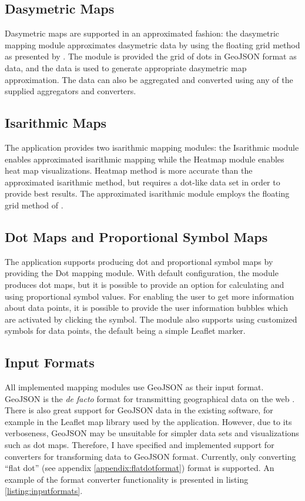 \subsection{Dasymetric Maps}

Dasymetric maps are supported in an approximated fashion: the dasymetric mapping module approximates dasymetric data by using the floating grid method as presented by \citet{langford_generating_1994}. The module is provided the grid of dots in GeoJSON format as data, and the data is used to generate appropriate dasymetric map approximation. The data can also be aggregated and converted using any of the supplied aggregators and converters.

\subsection{Isarithmic Maps}

The application provides two isarithmic mapping modules: the Isarithmic module enables approximated isarithmic mapping while the Heatmap module enables heat map visualizations. Heatmap method is more accurate than the approximated isarithmic method, but requires a dot-like data set in order to provide best results. The approximated isarithmic module employs the floating grid method of \citet{langford_generating_1994}.

\subsection{Dot Maps and Proportional Symbol Maps}

The application supports producing dot and proportional symbol maps by providing the Dot mapping module. With default configuration, the module produces dot maps, but it is possible to provide an option for calculating and using proportional symbol values. For enabling the user to get more information about data points, it is possible to provide the user information bubbles which are activated by clicking the symbol. The module also supports using customized symbols for data points, the default being a simple Leaflet marker.

\subsection{Input Formats}

All implemented mapping modules use GeoJSON as their input format. GeoJSON is the \emph{de facto} format for transmitting geographical data on the web \citep{bostock_code_2013}. There is also great support for GeoJSON data in the existing software, for example in the Leaflet map library used by the application. However, due to its verboseness, GeoJSON may be unsuitable for simpler data sets and visualizations such as dot maps. Therefore, I have specified and implemented support for converters for transforming data to GeoJSON format. Currently, only converting ``flat dot'' (see appendix \ref{appendix:flatdotformat}) format is supported. An example of the format converter functionality is presented in listing \ref{listing:inputformats}.

